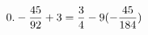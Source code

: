 \documentclass[preview]{standalone}
\begin{document}
\begin{align*}
\special{dvisvgm:raw <g id='unique000'>}0.- \frac{45}{92} + 3 = \frac{3}{4} - 9(- \frac{45}{184})\special{dvisvgm:raw </g>}
\end{align*}
\end{document}

